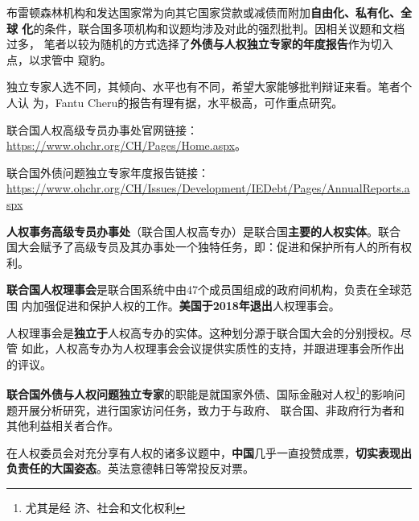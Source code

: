 布雷顿森林机构和发达国家常为向其它国家贷款或减债而附加\textbf{自由化、私有化、全球
  化}的条件，联合国多项机构和议题均涉及对此的强烈批判。因相关议题和文档过多，
笔者以较为随机的方式选择了\textbf{外债与人权独立专家的年度报告}作为切入点，以求管中
窥豹。

独立专家人选不同，其倾向、水平也有不同，希望大家能够批判辩证来看。笔者个人认
为，Fantu Cheru的报告有理有据，水平极高，可作重点研究。

联合国人权高级专员办事处官网链接：\url{https://www.ohchr.org/CH/Pages/Home.aspx}。

联合国外债问题独立专家年度报告链接：\url{https://www.ohchr.org/CH/Issues/Development/IEDebt/Pages/AnnualReports.aspx}


\textbf{人权事务高级专员办事处}（联合国人权高专办）是联合国\textbf{主要的人权实体}。联合
国大会赋予了高级专员及其办事处一个独特任务，即：促进和保护所有人的所有权利。

\textbf{联合国人权理事会}是联合国系统中由47个成员国组成的政府间机构，负责在全球范围
内加强促进和保护人权的工作。\textbf{美国于2018年退出}人权理事会。

人权理事会是\textbf{独立于}人权高专办的实体。这种划分源于联合国大会的分别授权。尽管
如此，人权高专办为人权理事会会议提供实质性的支持，并跟进理事会所作出的评议。

\textbf{联合国外债与人权问题独立专家}的职能是就国家外债、国际金融对人权\footnote{尤其是经
  济、社会和文化权利}的影响问题开展分析研究，进行国家访问任务，致力于与政府、
联合国、非政府行为者和其他利益相关者合作。

在人权委员会对充分享有人权的诸多议题中，\textbf{中国}几乎一直投赞成票，\textbf{切实表现出
  负责任的大国姿态}。英法意德韩日等常投反对票。

